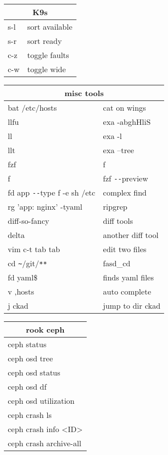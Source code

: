 \documentclass[12pt,paper=landscape,paper=a4]{scrartcl}
\begin{document}
\begin{multicols}{3}
    \vspace{1em}

    \begin{tabular}{ll}
        \multicolumn{2}{c}{K9s}\\
        \hline
        s-l  & sort available\\
        s-r  & sort ready\\
        c-z  & toggle faults\\
        c-w  & toggle wide\\
    \end{tabular}

    \vspace{1em}

    \begin{tabular}{ll}
        \multicolumn{2}{c}{misc tools}\\
        \hline
        bat /etc/hosts  & cat on wings\\
        llfu            & exa -abghHliS\\
        ll              & exa -l\\
        llt             & exa --tree\\
        fzf             & f\\
        f               & fzf \verb!--!preview\\
        fd app \verb!--!type f -e sh /etc & complex find \\
        rg 'app: nginx' -tyaml  & ripgrep \\
        diff-so-fancy           & diff tools\\
        delta                   & another diff tool\\
        vim c-t tab tab         & edit two files\\
        cd \verb!~!/git/\verb!**! & fasd\_cd \\
        fd yaml\$       & finds yaml files\\
        v ,hosts        & auto complete\\
        j ckad          & jump to dir ckad\\
    \end{tabular}

    \vspace{1em}

    \begin{tabular}{l}
        \multicolumn{1}{c}{rook ceph}\\
        \hline
        ceph status\\
        ceph osd tree\\
        ceph osd status\\
        ceph osd df\\
        ceph osd utilization\\
        ceph crash ls\\
        ceph crash info \textless{}ID\textgreater\\
        ceph crash archive-all\\
    \end{tabular}


\end{multicols}
\end{document}
